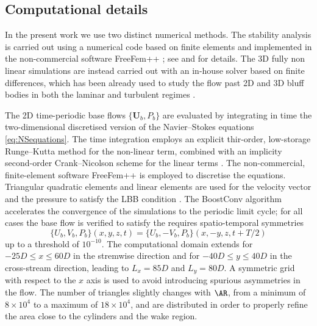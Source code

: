 \documentclass{jfm}
\begin{document}
\subsection{Computational details}

In the present work we use two distinct numerical methods. The stability analysis is carried out using a numerical code based on finite elements and implemented in the non-commercial software FreeFem++ \citep{hecht-2012}; see \cite{chiarini-quadrio-auteri-2022d} and \cite{chiarini-nastro-2025} for details. The 3D fully non linear simulations are instead carried out with an in-house solver based on finite differences, which has been already used to study the flow past 2D and 3D bluff bodies in both the laminar and turbulent regimes \citep{chiarini-quadrio-auteri-2022d,chiarini-boujo-2024,chiarini-etal-2022}.

The 2D time-periodic base flows $\{\bm{U}_b,P_b\}$ are evaluated by integrating in time the two-dimensional discretised version of the Navier--Stokes equations \ref{eq:NSequations}. The time integration employs an explicit thir-order, low-storage Runge--Kutta method for the non-linear term, combined with an implicity second-order Crank--Nicolson scheme for the linear terms \cite{rai-moin-1991}. The non-commercial, finite-element software FreeFem++ is employed to discretise the equations. Triangular quadratic elements and linear elements are used for the velocity vector and the pressure to satisfy the LBB condition \citep{brezzi-1974}. The BoostConv algorithm \citep{citro-etal-2017} accelerates the convergence of the simulations to the periodic limit cycle; for all cases the base flow is verified to satisfy the requires spatio-temporal symmetries 
\begin{equation}
\{U_b,V_b,P_b\}(x,y,z,t) = \{U_b,-V_b,P_b\}(x,-y,z,t+T/2)
\end{equation}
up to a threshold of $10^{-10}$. The computational domain extends for $-25 D\le x \le 60 D$ in the stremwise direction and for $-40 D \le y \le 40 D $ in the cross-stream direction, leading to $L_x=85D$ and $L_y=80D$. A symmetric grid with respect to the $x$ axis is used to avoid introducing spurious asymmetries in the flow. The number of triangles slightly changes with $\AR$, from a minimum of $8 \times 10^4$ to a maximum of $18 \times 10^4$, and are distributed in order to properly refine the area close to the cylinders and the wake region.
\end{document}
